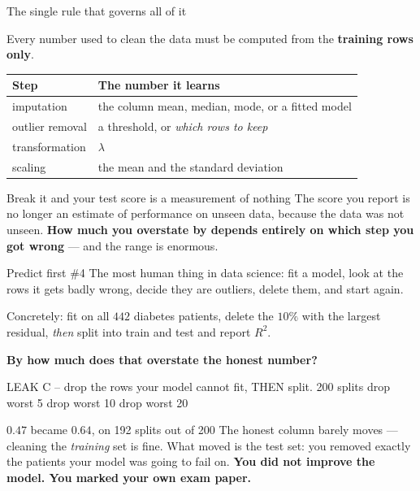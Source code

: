 \documentclass[aspectratio=169]{beamer}
\begin{document}
\begin{frame}[shrink=6]{The single rule that governs all of it}
  \begin{exampleblock}{}
    \centering \large
    Every number used to clean the data must be computed from the
    \textbf{training rows only}.
  \end{exampleblock}
  \vspace{0.4em}
  \begin{center}\small
  \begin{tabular}{@{}ll@{}}
    \toprule
    \textbf{Step} & \textbf{The number it learns}\\
    \midrule
    imputation & the column mean, median, mode, or a fitted model\\
    outlier removal & a threshold, or \emph{which rows to keep}\\
    transformation & $\lambda$\\
    scaling & the mean and the standard deviation\\
    \bottomrule
  \end{tabular}
  \end{center}
  \vspace{0.3em}
  \begin{alertblock}{Break it and your test score is a measurement of nothing}
    \small The score you report is no longer an estimate of performance on
    unseen data, because the data was not unseen. \textbf{How much you
    overstate by depends entirely on which step you got wrong} --- and the
    range is enormous.
  \end{alertblock}
\end{frame}

\begin{frame}[fragile,shrink=6]{Predict first \#4}
The most human thing in data science: fit a model, look at the rows it gets
badly wrong, decide they are outliers, delete them, and start again.

Concretely: fit on all $442$ diabetes patients, delete the $10\%$ with the
largest residual, \emph{then} split into train and test and report $R^2$.

\begin{center}
  \textbf{By how much does that overstate the honest number?}
\end{center}
\vspace{0.3em}
\begin{outblk}
LEAK C -- drop the rows your model cannot fit, THEN split.  200 splits
  drop worst 5%
  drop worst 10%
  drop worst 20%
\end{outblk}
\begin{alertblock}{$0.47$ became $0.64$, on 192 splits out of 200}
  \footnotesize The honest column barely moves --- cleaning the \emph{training}
  set is fine. What moved is the test set: you removed exactly the patients
  your model was going to fail on. \textbf{You did not improve the model. You
  marked your own exam paper.}
\end{alertblock}
\end{frame}
\end{document}
